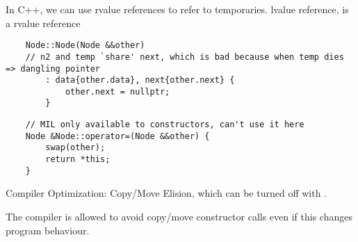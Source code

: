 In C++, we can use rvalue references to refer to temporaries. 
lvalue reference,  is a rvalue reference

\begin{lstlisting}
    Node::Node(Node &&other)
    // n2 and temp `share' next, which is bad because when temp dies => dangling pointer
        : data{other.data}, next{other.next} {
            other.next = nullptr;
        }
\end{lstlisting}

\begin{lstlisting}
    // MIL only available to constructors, can't use it here
    Node &Node::operator=(Node &&other) {
        swap(other);
        return *this;
    }
\end{lstlisting}

Compiler Optimization: Copy/Move Elision, which can be turned off with
.

The compiler is allowed to avoid copy/move constructor calls even if this
changes program behaviour.
